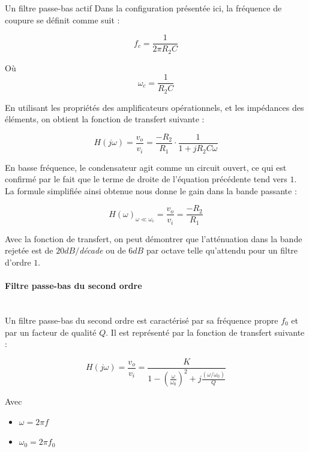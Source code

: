 \documentclass[conference,onecolumn]{IEEEtran}
\begin{document}
Un filtre passe-bas actif
Dans la configuration présentée ici, la fréquence de coupure se définit comme suit :

\begin{equation}
    f_c = \frac{1}{2\pi R_2C} 
\end{equation}

Où  
\begin{equation}
    \omega_c = \frac{1}{R_2 C}
\end{equation}

En utilisant les propriétés des amplificateurs opérationnels, et les impédances des éléments, on obtient la fonction de transfert suivante :

\begin{equation}
    H(j\omega)= \frac{v_o}{v_i} = \frac{-R_2}{R_1} \cdot \frac{1}{1 + jR_2 C\omega}
\end{equation}

En basse fréquence, le condensateur agit comme un circuit ouvert, ce qui est confirmé par le fait que le terme de droite de l'équation précédente tend vers $1$. La formule simplifiée ainsi obtenue nous donne le gain dans la bande passante :

\begin{equation}
    H(\omega)_{\omega \ll \omega_c}  = \frac{v_o}{v_i} = \frac{-R_2}{R_1}
\end{equation}


Avec la fonction de transfert, on peut démontrer que l'atténuation dans la bande rejetée est de $20 dB/$\textit{décade} ou de $6dB$ par octave telle qu'attendu pour un filtre d'ordre $1$.
\medskip

\paragraph{Filtre passe-bas du second ordre}
\hfill\\
Un filtre passe-bas du second ordre est caractérisé par sa fréquence propre $f_0$ et par un facteur de qualité $Q$.  Il est représenté par la fonction de transfert suivante :


\begin{equation}
    H(j\omega) = \frac{v_o}{v_i} = \frac{K}{1 - (\frac{\omega}{\omega_0})^2 + j\frac{(\omega/\omega_0)}{Q}}
\end{equation}

Avec
\begin{itemize}
  \item[] $\omega =  2\pi f$
  \item[] $\omega_0 = 2\pi f_0$ 
\end{itemize}
\end{document}
